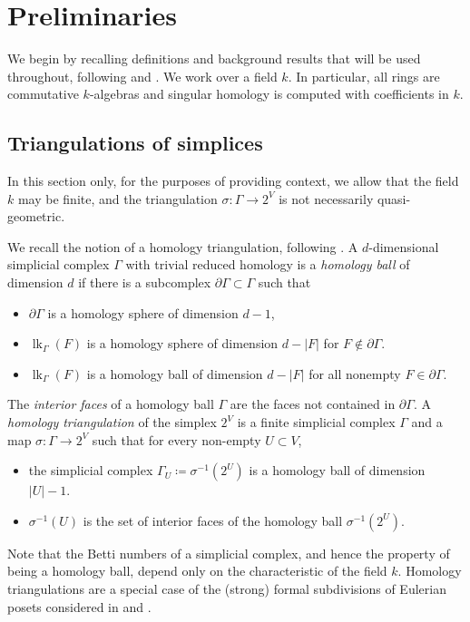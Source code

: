 \documentclass[ALCO, Unicode,published]{cedram}
\DeclareMathOperator{\lk}{lk}
\begin{document}
\section{Preliminaries} \label{sec:sr}

We begin by recalling definitions and background results that will be used throughout, following \cite[Chapter~III]{Stanley96} and \cite{Athanasiadis16}. We work over a field $k$. In particular, all rings are commutative $k$-algebras and singular homology is computed with coefficients in $k$.    

\subsection{Triangulations of simplices} \label{sec:triangulations}
In this section only, for the purposes of providing context, we allow that the field $k$ may be finite, and the triangulation $\sigma \colon \Gamma \to 2^V$ is not necessarily quasi-geometric.

 

We recall the notion of a homology triangulation, following \cite{Athanasiadis12}.  A $d$-dimensional simplicial complex $\Gamma$ with trivial reduced homology is a \emph{homology ball} 
of dimension $d$ if there is a subcomplex $\partial \Gamma \subset \Gamma$  such that 
\begin{itemize}
\item $\partial \Gamma$ is a homology sphere of dimension $d -1$,
\item $\lk_\Gamma(F)$ is a homology sphere of dimension $d - |F|$ for $F \not \in \partial \Gamma$.
\item $\lk_\Gamma(F)$ is a homology ball of dimension $d - |F|$ for all nonempty $F \in \partial \Gamma$.
\end{itemize}
The \emph{interior faces} of a homology ball $\Gamma$ are the faces not contained in $\partial \Gamma$.  A  \emph{homology triangulation} of the simplex $2^V$ is a finite simplicial complex $\Gamma$ and a map $\sigma\colon \Gamma \to 2^V$ such that for every non-empty $U \subset V$,
\begin{itemize}
\item the simplicial complex $\Gamma_U  \coloneqq  \sigma^{-1}(2^U)$ is a homology ball of dimension $\vert U \vert - 1$.
\item $\sigma^{-1}(U)$ is the set of interior faces of the homology ball $\sigma^{-1}(2^U)$.
\end{itemize}
Note that the Betti numbers of a simplicial complex, and hence the property of being a homology ball, depend only on the characteristic of the field $k$. Homology triangulations are a special case of the (strong) formal subdivisions of Eulerian posets considered in \cite[Section~7]{Stanley92} and \cite[Section~3]{KatzStapledon16}.
\end{document}

